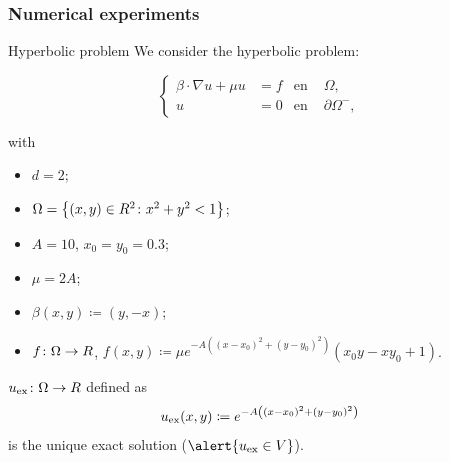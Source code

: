 	\subsubsection{Numerical experiments}
	\begin{frame}{Hyperbolic problem}
		\scriptsize
		We consider the hyperbolic problem:
		\begin{block}{}
		\begin{equation*}
		\left\{
		\begin{aligned}
		\beta\cdot\nabla u+\mu u&=f & \text{en } &\Omega, \\
		u&=0 & \text{en } &\partial\Omega^-,
		\end{aligned}
		\right.
		\end{equation*}
		\end{block}
		with
		\begin{itemize}
			\item $d=2$;
			\item $\Omega=\left\{(x,y)\in\relax R^2\colon x^2+y^2<1 \right\}$;
			\item $A=10$, $x_0=y_0=0.3$;
			\item $\mu=2A$;
			\item $\beta(x,y)\coloneqq(y,-x)$;
			\item $f\colon\Omega\to\relax R$, $f(x,y)\coloneqq \mu e^{-A\left((x-x_0)^2+(y-y_0)^2\right)}(x_0 y -x y_0 + 1)$.
		\end{itemize}
		
		\vspace*{0.3cm}
		$u_{\text{ex}}\colon\Omega\to\relax R$ defined as
		\begin{equation*}
		\label{sol_experimento_hiperbolico}
		u_{\text{ex}} (x,y)\coloneqq e^{-A\left((x-x_0)^2+(y-y_0)^2\right)}
		\end{equation*}
		is the \alert{unique exact solution} ($\alert{u_\text{ex}\in V}$).
		
		\end{frame}
		
